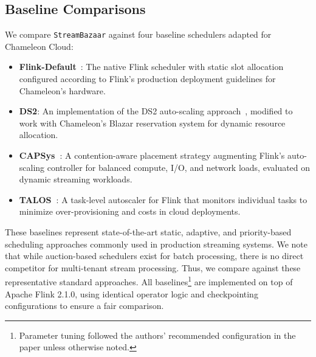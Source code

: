 \documentclass[lettersize,journal]{IEEEtran}
\begin{document}

\subsection{Baseline Comparisons}
\label{subsec:baselines}

We compare \texttt{StreamBazaar} against four baseline schedulers adapted for Chameleon Cloud:
\begin{itemize}[leftmargin=*,wide]
    \item \textbf{Flink-Default}~\cite{carbone2015apache}: The native Flink scheduler with static slot allocation configured according to Flink's production deployment guidelines for Chameleon's hardware.
    \item \textbf{DS2}: An implementation of the DS2 auto-scaling approach~\cite{kalavri2018three}, modified to work with Chameleon's Blazar reservation system for dynamic resource allocation.
    \item \textbf{CAPSys~\cite{wang2025capsys}}: A contention-aware placement strategy augmenting Flink's auto-scaling controller for balanced compute, I/O, and network loads, evaluated on dynamic streaming workloads.
    \item \textbf{TALOS~\cite{ntouni2024talos}}: A task-level autoscaler for Flink that monitors individual tasks to minimize over-provisioning and costs in cloud deployments.
\end{itemize}
\noindent These baselines represent state-of-the-art static, adaptive, and priority-based scheduling approaches commonly used in production streaming systems. We note that while auction-based schedulers exist for batch processing, there is no direct competitor for multi-tenant stream processing. Thus, we compare against these representative standard approaches. All baselines\footnote{Parameter tuning followed the authors' recommended configuration in the paper unless otherwise noted.} are implemented on top of Apache Flink 2.1.0, using identical operator logic and checkpointing configurations to ensure a fair comparison.
\end{document}
